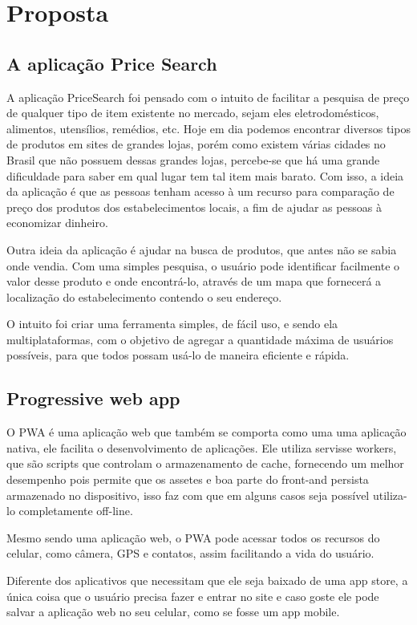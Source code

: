 \section{Proposta}

\subsection{A aplicação Price Search}
A aplicação PriceSearch foi pensado com o intuito de facilitar a pesquisa de preço de qualquer tipo de item existente no mercado, sejam eles eletrodomésticos, alimentos, utensílios, remédios, etc. Hoje em dia podemos encontrar diversos tipos de produtos em sites de grandes lojas, porém como existem várias cidades no Brasil que não possuem dessas grandes lojas, percebe-se que há uma grande dificuldade para saber em qual lugar tem tal item mais barato. Com isso, a ideia da aplicação é que as pessoas tenham acesso à um recurso para comparação de preço dos produtos dos estabelecimentos locais, a fim de ajudar as pessoas à economizar dinheiro. 

Outra ideia da aplicação é ajudar na busca de produtos, que antes não se sabia onde vendia. Com uma simples pesquisa, o usuário pode identificar facilmente o valor desse produto e onde encontrá-lo, através de um mapa que fornecerá a localização do estabelecimento contendo o seu endereço.

O intuito foi criar uma ferramenta simples, de fácil uso, e sendo ela multiplataformas, com o objetivo de agregar a quantidade máxima de usuários possíveis, para que todos possam usá-lo de maneira eficiente e rápida.

\subsection{Progressive web app}

O PWA é uma aplicação web que também se comporta como uma uma aplicação nativa, ele facilita o desenvolvimento de aplicações. Ele utiliza servisse workers, que são scripts que controlam o armazenamento de cache, fornecendo um melhor desempenho pois permite que os assetes e boa parte do front-and persista armazenado no dispositivo, isso faz com que em alguns casos seja possível utiliza-lo completamente off-line.

Mesmo sendo uma aplicação web, o PWA pode acessar todos os recursos do celular, como câmera, GPS e contatos, assim facilitando a vida do usuário.

Diferente dos aplicativos que necessitam que ele seja baixado de uma app store, a única coisa que o usuário precisa fazer e entrar no site e caso goste ele pode salvar a aplicação web no seu celular, como se fosse um app mobile.


